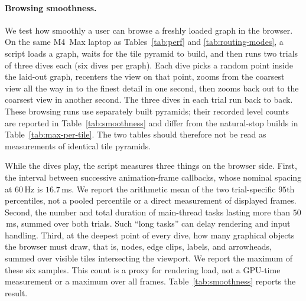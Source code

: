 \documentclass[review]{vgtc}          %
\begin{document}
\paragraph{Browsing smoothness.}
We test how smoothly a user can browse a freshly loaded graph in the
browser. On the same M4~Max laptop as Tables~\ref{tab:perf} and
\ref{tab:routing-modes}, a script loads a graph, waits for the tile
pyramid to build, and then runs two trials of three dives each
(six dives per graph). Each dive picks
a random point inside the laid-out graph, recenters the view on that
point, zooms from the coarsest view all the way in to the finest
detail in one second, then zooms back out to the coarsest view in
another second. The three dives in each trial run back to back.
These browsing runs use separately built pyramids; their recorded
level counts are reported in Table~\ref{tab:smoothness} and differ
from the natural-stop builds in Table~\ref{tab:max-per-tile}.
The two tables should therefore not be read as measurements of
identical tile pyramids.

While the dives play, the script measures three things on the
browser side. First, the interval between successive animation-frame
callbacks, whose nominal spacing at $60$\,Hz is $16.7$\,ms. We report
the arithmetic mean of the two trial-specific $95$th percentiles,
not a pooled percentile or a direct measurement of displayed frames.
Second, the number and total duration of main-thread tasks lasting
more than $50$\,ms, summed over both trials. Such ``long tasks'' can
delay rendering and input handling. Third, at
the deepest point of every dive, how many graphical objects the
browser must draw, that is, nodes, edge clips, labels, and
arrowheads, summed over visible tiles intersecting the viewport.
We report the maximum of these six samples. This count is a proxy
for rendering load, not a GPU-time measurement or a maximum over
all frames. Table~\ref{tab:smoothness} reports the result.
\end{document}
